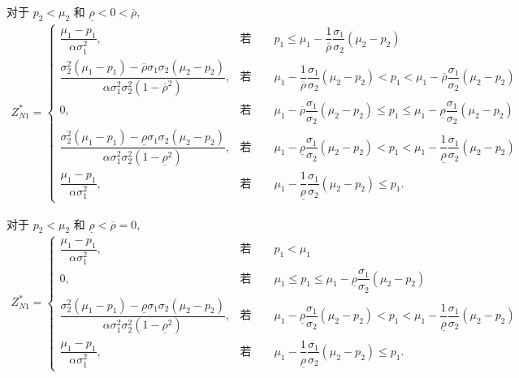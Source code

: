 \documentclass[10.0pt]{article}
\begin{document}
对于 $ p_2 < \mu_2 $ 和 $ \underline{\rho} < 0 < \overline{\rho} $,
{\footnotesize \begin{eqnarray}
Z_{N 1}^* = \left\{ \begin{matrix}
\dfrac{\mu_1 - p_1}{\alpha \sigma_1^2}, & \text{若} \qquad p_1 \leqslant \mu_1 - \dfrac1{\overline{\rho}} \dfrac{\sigma_1}{\sigma_2} (\mu_2 - p_2) \\
\dfrac{\sigma_2^2 (\mu_1 - p_1) - \overline{\rho} \sigma_1 \sigma_2 (\mu_2 - p_2)}{\alpha \sigma_1^2 \sigma_2^2 (1 - \overline{\rho}^2)}, & \text{若} \qquad \mu_1 - \dfrac1{\overline{\rho}} \dfrac{\sigma_1}{\sigma_2} (\mu_2 - p_2) < p_1 < \mu_1 - \overline{\rho} \dfrac{\sigma_1}{\sigma_2} (\mu_2 - p_2) \\
0, & \text{若} \qquad \mu_1 - \overline{\rho} \dfrac{\sigma_1}{\sigma_2} (\mu_2 - p_2) \leqslant p_1 \leqslant \mu_1 - \underline{\rho} \dfrac{\sigma_1}{\sigma_2} (\mu_2 - p_2) \\
\dfrac{\sigma_2^2 (\mu_1 - p_1) - \underline{\rho} \sigma_1 \sigma_2 (\mu_2 - p_2)}{\alpha \sigma_1^2 \sigma_2^2 (1 - \underline{\rho}^2)}, & \text{若} \qquad \mu_1 - \underline{\rho} \dfrac{\sigma_1}{\sigma_2} (\mu_2 - p_2) < p_1 < \mu_1 - \dfrac1{\underline{\rho}} \dfrac{\sigma_1}{\sigma_2} (\mu_2 - p_2) \\
\dfrac{\mu_1 - p_1}{\alpha \sigma_1^2}, & \text{若} \qquad \mu_1 - \dfrac1{\underline{\rho}} \dfrac{\sigma_1}{\sigma_2} (\mu_2 - p_2) \leqslant p_1.
\end{matrix} \right.
\end{eqnarray}}

对于 $ p_2 < \mu_2 $ 和 $ \underline{\rho} < \overline{\rho} = 0 $,
{\footnotesize \begin{eqnarray}
Z_{N 1}^* = \left\{ \begin{matrix}
\dfrac{\mu_1 - p_1}{\alpha \sigma_1^2}, & \text{若} \qquad p_1 < \mu_1 \\
0, & \text{若} \qquad \mu_1 \leqslant p_1 \leqslant \mu_1 - \underline{\rho} \dfrac{\sigma_1}{\sigma_2} (\mu_2 - p_2) \\
\dfrac{\sigma_2^2 (\mu_1 - p_1) - \underline{\rho} \sigma_1 \sigma_2 (\mu_2 - p_2)}{\alpha \sigma_1^2 \sigma_2^2 (1 - \underline{\rho}^2)}, & \text{若} \qquad \mu_1 - \underline{\rho} \dfrac{\sigma_1}{\sigma_2} (\mu_2 - p_2) < p_1 < \mu_1 - \dfrac1{\underline{\rho}} \dfrac{\sigma_1}{\sigma_2} (\mu_2 - p_2) \\
\dfrac{\mu_1 - p_1}{\alpha \sigma_1^2}, & \text{若} \qquad \mu_1 - \dfrac1{\underline{\rho}} \dfrac{\sigma_1}{\sigma_2} (\mu_2 - p_2) \leqslant p_1.
\end{matrix} \right.
\end{eqnarray}}
\end{document}
